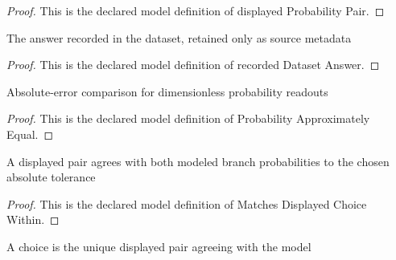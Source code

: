 \begin{proof}
  This is the declared model definition of displayed Probability Pair.
\end{proof}
\begin{definition}
  \label{def:physics:phyx-mini-0541:phyxminiproblems-problemphyxmini0541-recordeddatasetanswer}
  The answer recorded in the dataset, retained only as source metadata
\end{definition}
\begin{proof}
  This is the declared model definition of recorded Dataset Answer.
\end{proof}
\begin{definition}
  \label{def:physics:phyx-mini-0541:phyxminiproblems-problemphyxmini0541-probabilityapproximatelyequal}
  Absolute-error comparison for dimensionless probability readouts
\end{definition}
\begin{proof}
  This is the declared model definition of Probability Approximately Equal.
\end{proof}
\begin{definition}
  \label{def:physics:phyx-mini-0541:phyxminiproblems-problemphyxmini0541-matchesdisplayedchoicewithin}
  A displayed pair agrees with both modeled branch probabilities to the chosen absolute tolerance
\end{definition}
\begin{proof}
  This is the declared model definition of Matches Displayed Choice Within.
\end{proof}
\begin{definition}
  \label{def:physics:phyx-mini-0541:phyxminiproblems-problemphyxmini0541-isuniquematchinganswerchoice}
  A choice is the unique displayed pair agreeing with the model
\end{definition}
